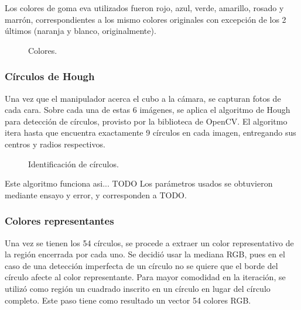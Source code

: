 Los colores de goma eva utilizados fueron rojo, azul, verde, amarillo, rosado y marrón, correspondientes a los mismo colores originales con excepción de los 2 últimos (naranja y blanco, originalmente).

\begin{figure}[h!]
	\centering
	\caption{Colores.}
	\label{colorescubo}
\end{figure}

\subsubsection{Círculos de Hough}
Una vez que el manipulador acerca el cubo a la cámara, se capturan fotos de cada cara. Sobre cada una de estas 6 imágenes, se aplica el algoritmo de Hough para detección de círculos, provisto por la biblioteca de OpenCV. El algoritmo itera hasta que encuentra exactamente 9 círculos en cada imagen, entregando sus centros y radios respectivos.

\begin{figure}[h!]
	\centering
	\caption{Identificación de círculos.}
	\label{circulos}
\end{figure}
Este algoritmo funciona asi... TODO
Los parámetros usados se obtuvieron mediante ensayo y error, y corresponden a TODO.

\subsubsection{Colores representantes}
Una vez se tienen los 54 círculos, se procede a extraer un color representativo de la región encerrada por cada uno. Se decidió usar la mediana RGB, pues en el caso de una detección imperfecta de un círculo no se quiere que el borde del círculo afecte al color representante. Para mayor comodidad en la iteración, se utilizó como región un cuadrado inscrito en un círculo en lugar del círculo completo. Este paso tiene como resultado un vector 54 colores RGB.

